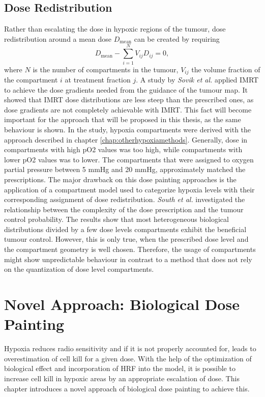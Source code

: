 \subsection{Dose Redistribution}
Rather than escalating the dose in hypoxic regions of the tumour, dose redistribution around a mean dose $D_\mathrm{mean}$ can be created by requiring
\begin{equation}
D_\mathrm{mean} - \sum\limits_{i=1}^NV_{ij}D_{ij} = 0,
\end{equation}
where $N$ is the number of compartments in the tumour, $V_{ij}$ the volume fraction of the compartment $i$ at treatment fraction $j$. A study by \textit{Sovik et al.} \cite{pmid17674980} applied IMRT to achieve the dose gradients needed from the guidance of the tumour map. It showed that IMRT dose distributions are less steep than the prescribed ones, as dose gradients are not completely  achievable with IMRT. This fact will become important for the approach that will be proposed in this thesis, as the same behaviour is shown. In the study, hypoxia compartments were derived with the approach described in chapter \ref{chap:otherhypoxiamethods}. Generally, dose in compartments with high pO2 values was too high, while compartments with lower pO2 values was to lower. The compartments that were assigned to oxygen partial pressure between 5 mmHg and 20 mmHg, approximately matched the prescriptions. The major drawback on this dose painting approaches is the application of a compartment model used to categorize hypoxia levels with their corresponding assignment of dose redistribution. \textit{South et al.} \cite{pmid19928068} investigated the relationship between the complexity of the dose prescription and the tumour control probability. The results show that most heterogeneous biological distributions divided by a few dose levels compartments exhibit the beneficial tumour control. However, this is only true, when the prescribed dose level and the compartment geometry is well chosen. Therefore, the usage of compartments might show unpredictable behaviour in contrast to a method that does not rely on the quantization of dose level compartments.
\section{Novel Approach: Biological Dose Painting}
Hypoxia reduces radio sensitivity and if it is not properly accounted for, leads to overestimation of cell kill for a given dose. With the help of the optimization of biological effect and incorporation of HRF into the model, it is possible to increase cell kill in hypoxic areas by an appropriate escalation of dose. This chapter introduces a novel approach of biological dose painting to achieve this.
